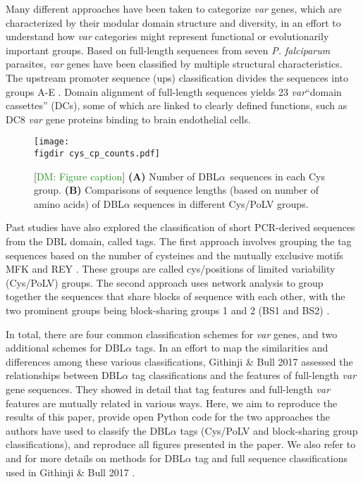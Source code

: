 \documentclass[10pt,twocolumn,superscriptaddress]{revtex4-1}
\newcommand{\dieumycom}[1]{[\textcolor{ForestGreen}{DM: #1}]}
\newcommand{\var}{{\it var}\xspace}
\newcommand{\pf}{{\it P. falciparum}\xspace}
\newcommand{\dbla}{{DBL$\alpha$}\xspace}
\newcommand{\cp}{{Cys/PoLV}\xspace}
\newcommand{\paper}{{Githinji \& Bull}\xspace}
\newcommand{\figdir}{figures/}
\begin{document}
Many different approaches have been taken to categorize \var genes, which are characterized by their modular domain structure and diversity, in an effort to understand how \var categories might represent functional or evolutionarily important groups. Based on full-length sequences from seven \pf parasites, \var genes have been classified by multiple structural characteristics. The upstream promoter sequence (ups) classification divides the sequences into groups A-E \cite{rask2010, vazquez2002}. Domain alignment of full-length sequences yields 23 \var ``domain cassettes'' (DCs), some of which are linked to clearly defined functions, such as DC8 \var gene proteins binding to brain endothelial cells. 

\begin{figure}[t]
	\centering
	\texttt{[image: \\figdir cys\_cp\_counts.pdf]}
	\caption{ \dieumycom{Figure caption} \textbf{(A)} Number of \dbla\ sequences in each Cys group.  \textbf{(B)} Comparisons of sequence lengths (based on number of amino acids) of \dbla sequences in different \cp groups.}
	\label{cp}
\end{figure}

Past studies have also explored the classification of short PCR-derived sequences from the DBL domain, called tags. The first approach involves grouping the tag sequences based on the number of cysteines and the mutually exclusive motifs MFK and REY \cite{bull2007}. These groups are called cys/positions of limited variability (\cp) groups. The second approach uses network analysis to group together the sequences that share blocks of sequence with each other, with the two prominent groups being block-sharing groups 1 and 2 (BS1 and BS2) \cite{bull2008}.  

In total, there are four common classification schemes for \var genes, and two additional schemes for \dbla tags. In an effort to map the similarities and differences among these various classifications, \paper 2017 \cite{githinji2017} assessed the relationships between \dbla tag classifications and the features of full-length \var gene sequences. They showed in detail that tag features and full-length \var features are mutually related in various ways. Here, we aim to reproduce the results of this paper, provide open Python code \cite{github} for the two approaches the authors have used to classify the \dbla tags (\cp and block-sharing group classifications), and reproduce all figures presented in the paper. We also refer to \cite{bull2008, bull2007} and \cite{rask2010} for more details on methods for \dbla tag and full sequence classifications used in \paper 2017 \cite{githinji2017}. 
\end{document}
